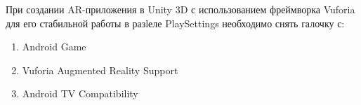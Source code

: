 
При создании AR-приложения в Unity 3D с использованием фреймворка Vuforia для его стабильной работы в разlеле PlaySettings необходимо снять галочку с:

\begin{enumerate}
    \item Android Game
    \item Vuforia Augmented Reality Support
    \item Android TV Compatibility
\end{enumerate}